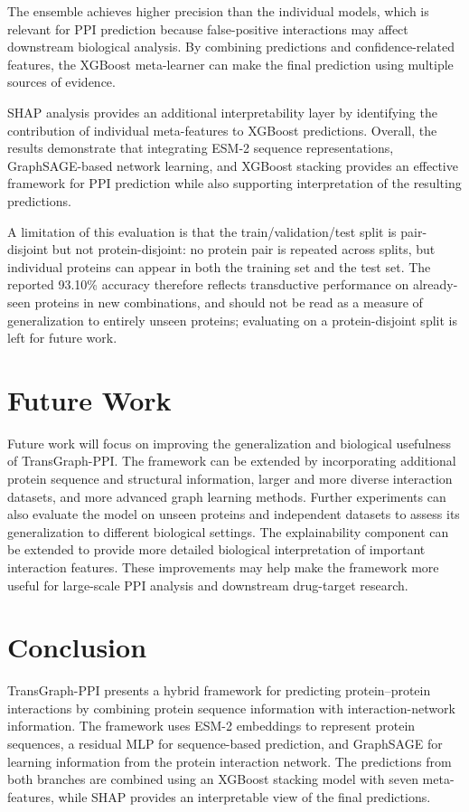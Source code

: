 \documentclass[conference]{IEEEtran}
\begin{document}
The ensemble achieves higher precision than the individual models, which is
relevant for PPI prediction because false-positive interactions may affect
downstream biological analysis. By combining predictions and confidence-related
features, the XGBoost meta-learner can make the final prediction using multiple
sources of evidence.

SHAP analysis provides an additional interpretability layer by identifying the
contribution of individual meta-features to XGBoost predictions. Overall, the
results demonstrate that integrating ESM-2 sequence representations,
GraphSAGE-based network learning, and XGBoost stacking provides an effective
framework for PPI prediction while also supporting interpretation of the
resulting predictions.

A limitation of this evaluation is that the train/validation/test split is
pair-disjoint but not protein-disjoint: no protein pair is repeated across
splits, but individual proteins can appear in both the training set and the
test set. The reported 93.10\% accuracy therefore reflects transductive
performance on already-seen proteins in new combinations, and should not be
read as a measure of generalization to entirely unseen proteins; evaluating
on a protein-disjoint split is left for future work.

\section{Future Work}\label{sec:future}
Future work will focus on improving the generalization and biological
usefulness of TransGraph-PPI. The framework can be extended by incorporating
additional protein sequence and structural information, larger and more diverse
interaction datasets, and more advanced graph learning methods. Further
experiments can also evaluate the model on unseen proteins and independent
datasets to assess its generalization to different biological settings. The
explainability component can be extended to provide more detailed biological
interpretation of important interaction features. These improvements may help
make the framework more useful for large-scale PPI analysis and downstream
drug-target research.

\section{Conclusion}\label{sec:conclusion}
TransGraph-PPI presents a hybrid framework for predicting protein--protein
interactions by combining protein sequence information with
interaction-network information. The framework uses ESM-2 embeddings to
represent protein sequences, a residual MLP for sequence-based prediction, and
GraphSAGE for learning information from the protein interaction network. The
predictions from both branches are combined using an XGBoost stacking model
with seven meta-features, while SHAP provides an interpretable view of the
final predictions.
\end{document}
